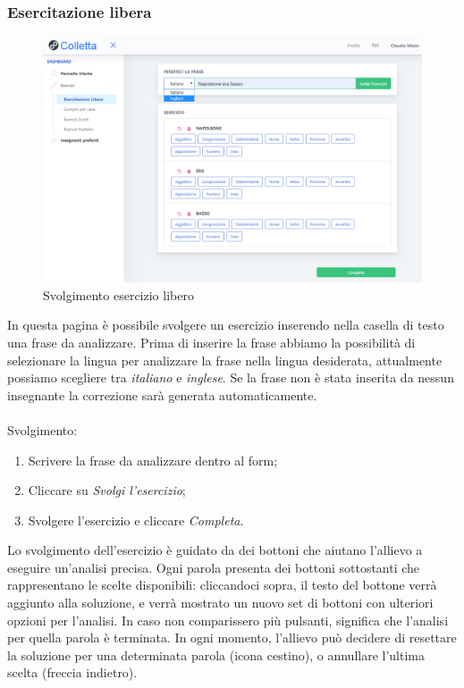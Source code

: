 		 \subsubsection{Esercitazione libera}      
        	\begin{figure}[H]
                \centering
                \includegraphics[width=17cm]{sez/img/studente/esercitazioneLiberaEsegui.PNG} 
                \caption{Svolgimento esercizio libero}\label{fig:1}
        	\end{figure}
          In questa pagina è possibile svolgere un esercizio inserendo nella casella di testo una frase da analizzare. Prima di inserire la frase abbiamo la possibilità di selezionare la lingua per analizzare la frase nella lingua desiderata, attualmente possiamo scegliere tra \textit{italiano}  e \textit{inglese}.
          Se la frase non è stata inserita da nessun insegnante la correzione sarà generata automaticamente.\\
        \\ Svolgimento:
        	\begin{enumerate}        
            	\item Scrivere la frase da analizzare dentro al form;
            	\item Cliccare su \textit{Svolgi l'esercizio};
            	\item Svolgere l'esercizio e cliccare \textit{Completa}.
        	\end{enumerate}
        	\label{sec:esLib}
        	Lo svolgimento dell'esercizio è guidato da dei bottoni che aiutano l'allievo a eseguire un'analisi precisa. Ogni parola presenta dei bottoni sottostanti che rappresentano le scelte disponibili: cliccandoci sopra, il testo del bottone verrà aggiunto alla soluzione, e verrà mostrato un nuovo set di bottoni con ulteriori opzioni per l'analisi. In caso non comparissero più pulsanti, significa che l'analisi per quella parola è terminata. In ogni momento, l'allievo può decidere di resettare la soluzione per una determinata parola (icona cestino), o annullare l'ultima scelta (freccia indietro).

